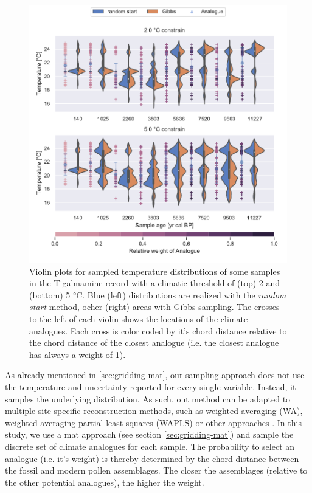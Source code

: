 \begin{refsection}
\begin{figure}[!t]
	\includegraphics[width=\linewidth]{gridding-figures/tigal-sample-climate-violins.pdf}
	\caption[Realized temperature distributions for a few samples]{Violin plots for sampled temperature distributions of some samples in the Tigalmamine record with a climatic threshold of (top) 2 and (bottom) 5 °C. Blue (left) distributions are realized with the \textit{random start} method, ocher (right) areas with Gibbs sampling. The crosses to the left of each violin shows the locations of the climate analogues. Each cross is color coded by it's chord distance relative to the chord distance of the closest analogue (i.e. the closest analogue has always a weight of 1).}
	\label{fig:gridding-temp-sampling-violins}
\end{figure}

As already mentioned in \ref{sec:gridding-mat}, our sampling approach does not use the temperature and uncertainty reported for every single variable. Instead, it samples the underlying distribution. As such, out method can be adapted to multiple site-specific reconstruction methods, such as weighted averaging (WA), weighted-averaging partial-least squares (WAPLS) \citep{BirksBraakLineEtAl1990, BraakJuggins1993} or other approaches \citep[e.g.][]{BirksHeiriSeppaeEtAl2010, BrewerGuiotBarboni2007, Juggins2013}. In this study, we use a \gls{mat} approach (see section \ref{sec:gridding-mat}) and sample the discrete set of climate analogues for each sample. The probability to select an analogue (i.e. it's weight) is thereby determined by the chord distance between the fossil and modern pollen assemblages. The closer the assemblages (relative to the other potential analogues), the higher the weight.


\end{refsection}
